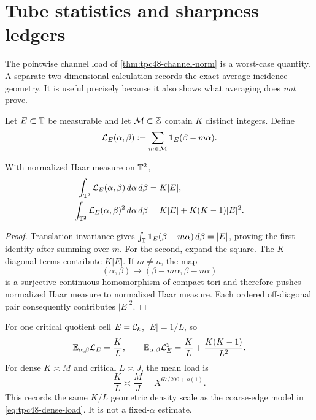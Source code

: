\section{Tube statistics and sharpness ledgers}
\label{sec:tpc48-tube-statistics}

The pointwise channel load of \cref{thm:tpc48-channel-norm} is a
worst-case quantity.  A separate two-dimensional calculation records
the exact average incidence geometry.  It is useful precisely because
it also shows what averaging does \emph{not} prove.

Let \(E\subset\mathbb T\) be measurable and let \(\mathcal M\subset\mathbb Z\) contain
\(K\) distinct integers.  Define
\begin{equation}
 \mathcal L_E(\alpha,\beta)
 :=\sum_{m\in\mathcal M}\mathbf 1_E(\beta-m\alpha).
 \label{eq:tpc48-two-dimensional-load}
\end{equation}

\begin{theorem}
\label{thm:tpc48-tube-moments}
With normalized Haar measure on \(\mathbb T^2\),
\begin{align}
 \int_{\mathbb T^2}\mathcal L_E(\alpha,\beta)\,d\alpha\,d\beta
 &=K|E|,
 \label{eq:tpc48-tube-first-moment}\\
 \int_{\mathbb T^2}\mathcal L_E(\alpha,\beta)^2\,d\alpha\,d\beta
 &=K|E|+K(K-1)|E|^2.
 \label{eq:tpc48-tube-second-moment}
\end{align}
\end{theorem}

\begin{proof}
Translation invariance gives
\(\int_\mathbb T\mathbf 1_E(\beta-m\alpha)\,d\beta=|E|\), proving the first
identity after summing over \(m\).  For the second, expand the square.
The \(K\) diagonal terms contribute \(K|E|\).  If \(m\ne n\), the map
\begin{equation}
 (\alpha,\beta)\longmapsto
 (\beta-m\alpha,\beta-n\alpha)
 \label{eq:tpc48-pair-torus-map}
\end{equation}
is a surjective continuous homomorphism of compact tori and therefore
pushes normalized Haar measure to normalized Haar measure.  Each
ordered off-diagonal pair consequently contributes \(|E|^2\).
\end{proof}

For one critical quotient cell \(E=\mathcal C_k\), \(|E|=1/L\), so
\begin{equation}
 \mathbb E_{\alpha,\beta}\mathcal L_E=\frac KL,
 \qquad
 \mathbb E_{\alpha,\beta}\mathcal L_E^2
 =\frac KL+\frac{K(K-1)}{L^2}.
 \label{eq:tpc48-critical-cell-moments}
\end{equation}
For dense \(K\asymp M\) and critical \(L\asymp J\), the mean load is
\begin{equation}
 \frac KL\asymp\frac MJ=X^{67/200+o(1)}.
 \label{eq:tpc48-average-critical-load}
\end{equation}
This records the same \(K/L\) geometric density scale as the
coarse-edge model in \eqref{eq:tpc48-dense-load}.  It is not a
fixed-\(\alpha\) estimate.

